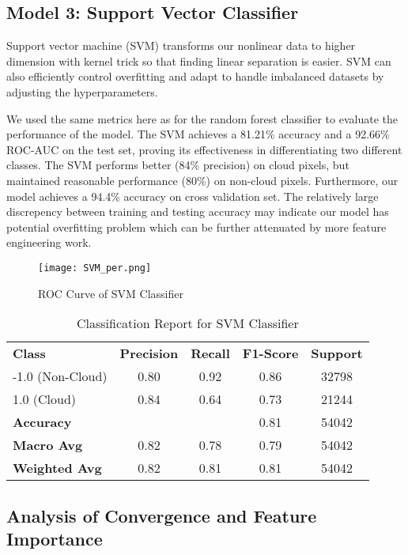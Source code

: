 \documentclass[10pt,letterpaper]{article}
\begin{document}
\subsection{Model 3: Support Vector Classifier}
Support vector machine (SVM) transforms our nonlinear data to higher dimension with kernel trick so that finding linear separation is easier. SVM can also efficiently control overfitting and adapt to handle imbalanced datasets by adjusting the hyperparameters. 

We used the same metrics here as for the random forest classifier to evaluate the performance of the model. The SVM achieves a 81.21\% accuracy and a 92.66\% ROC-AUC on the test set, proving its effectiveness in differentiating two different classes. The SVM performs better (84\% precision) on cloud pixels, but maintained reasonable performance (80\%) on non-cloud pixels. Furthermore, our model achieves a 94.4\% accuracy on cross validation set. The relatively large discrepency between training and testing accuracy may indicate our model has potential overfitting problem which can be further attenuated by more feature engineering work.
\begin{figure}[H]
    \centering
    \texttt{[image: SVM\_per.png]}
    \caption{ROC Curve of SVM Classifier}
    \label{fig:enter-label}
\end{figure}

\begin{table}[H]
\centering
\caption{Classification Report for SVM Classifier}
\begin{tabular}{lcccc}
\textbf{Class} & \textbf{Precision} & \textbf{Recall} & \textbf{F1-Score} & \textbf{Support} \\
-1.0 (Non-Cloud) & 0.80 & 0.92 & 0.86 & 32798 \\
1.0 (Cloud)      & 0.84 & 0.64 & 0.73 & 21244 \\
\textbf{Accuracy} & & & 0.81 & 54042 \\
\textbf{Macro Avg} & 0.82 & 0.78 & 0.79 & 54042 \\
\textbf{Weighted Avg} & 0.82 & 0.81  & 0.81 & 54042 \\
\end{tabular}
\end{table}



\subsection{Analysis of Convergence and Feature Importance}
\end{document}
